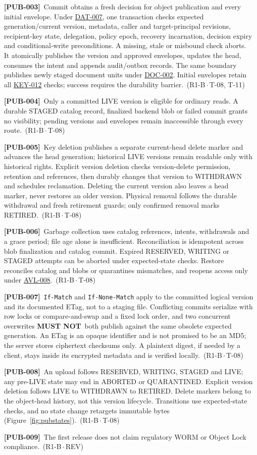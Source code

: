 \documentclass[11pt,a4paper]{article}
\newcommand{\mustnot}{\textbf{MUST NOT}}
\newcommand{\code}[1]{{\small\nolinkurl{#1}}}
\newcommand{\rr}[1]{\hyperlink{req:#1}{#1}}
\newcommand{\reqtag}[2]{{\footnotesize\color{accent}(#1\,$\cdot$\,#2)}}
\newcommand{\req}[4]{\par\noindent\hypertarget{req:#1}{\textbf{[#1]}}\ #4\ \reqtag{#2}{#3}\par}
\begin{document}
\req{PUB-003}{R1-B}{T-08, T-11}{Commit obtains a fresh decision for object publication and every initial envelope. Under \rr{DAT-007}, one transaction checks expected generation/current version, metadata, caller and target-principal revisions, recipient-key state, delegation, policy epoch, recovery incarnation, decision expiry and conditional-write preconditions. A missing, stale or misbound check aborts. It atomically publishes the version and approved envelopes, updates the head, consumes the intent and appends audit/outbox records. The same boundary publishes newly staged document units under \rr{DOC-002}. Initial envelopes retain all \rr{KEY-012} checks; success requires the durability barrier.}
\req{PUB-004}{R1-B}{T-08}{Only a committed LIVE version is eligible for ordinary reads. A durable STAGED catalog record, finalized backend blob or failed commit grants no visibility; pending versions and envelopes remain inaccessible through every route.}
\req{PUB-005}{R1-B}{T-08}{Key deletion publishes a separate current-head delete marker and advances the head generation; historical LIVE versions remain readable only with historical rights. Explicit version deletion checks version-delete permission, retention and references, then durably changes that version to WITHDRAWN and schedules reclamation. Deleting the current version also leaves a head marker, never restores an older version. Physical removal follows the durable withdrawal and fresh retirement guards; only confirmed removal marks RETIRED.}
\req{PUB-006}{R1-B}{T-08}{Garbage collection uses catalog references, intents, withdrawals and a grace period; file age alone is insufficient. Reconciliation is idempotent across blob finalization and catalog commit. Expired RESERVED, WRITING or STAGED attempts can be aborted under expected-state checks. Restore reconciles catalog and blobs or quarantines mismatches, and reopens access only under \rr{AVL-008}.}
\req{PUB-007}{R1-B}{T-08}{\code{If-Match} and \code{If-None-Match} apply to the committed logical version and its documented ETag, not to a staging file. Conflicting commits serialize with row locks or compare-and-swap and a fixed lock order, and two concurrent overwrites \mustnot\ both publish against the same obsolete expected generation. An ETag is an opaque identifier and is not promised to be an MD5; the server stores ciphertext checksums only. A plaintext digest, if needed by a client, stays inside its encrypted metadata and is verified locally.}
\req{PUB-008}{R1-B}{T-08}{An upload follows RESERVED, WRITING, STAGED and LIVE; any pre-LIVE state may end in ABORTED or QUARANTINED. Explicit version deletion follows LIVE to WITHDRAWN to RETIRED. Delete markers belong to the object-head history, not this version lifecycle. Transitions use expected-state checks, and no state change retargets immutable bytes (Figure~\ref{fig:pubstates}).}
\req{PUB-009}{R1-B}{REV}{The first release does not claim regulatory WORM or Object Lock compliance.}
\end{document}
